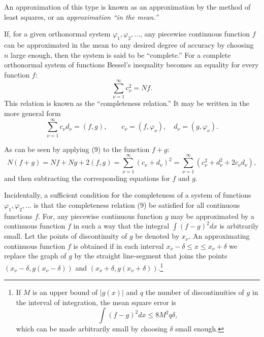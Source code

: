 An approximation of this type is known as an approximation by the method of least squares, or an \emph{approximation ``in the mean.''}

If, for a given orthonormal system $\varphi_1,\varphi_2,\ldots$, any piecewise continuous function $f$ can be approximated in the mean to any desired degree of accuracy by choosing $n$ large enough, then the system is said to be ``complete.'' For a complete orthonormal system of functions Bessel's inequality becomes an equality for every function $f$:
\begin{equation}\sum_{\nu=1}^{\infty}c_\nu^2=Nf.\tag{9}\end{equation}
This relation is known as the ``completeness relation.'' It may be written in the more general form
\begin{equation}\sum_{\nu=1}^{\infty}c_\nu d_\nu=(f,g),\qquad c_\nu=(f,\varphi_\nu),\quad d_\nu=(g,\varphi_\nu).\tag{9'}\end{equation}

As can be seen by applying (9) to the function $f+g$:
\[
N(f+g)=Nf+Ng+2(f,g)=\sum_{\nu=1}^{\infty}(c_\nu+d_\nu)^2
=\sum_{\nu=1}^{\infty}(c_\nu^2+d_\nu^2+2c_\nu d_\nu),
\]
and then subtracting the corresponding equations for $f$ and $g$.

Incidentally, a sufficient condition for the completeness of a system of functions $\varphi_1,\varphi_2,\ldots$ is that the completeness relation (9) be satisfied for all continuous functions $f$. For, any piecewise continuous function $g$ may be approximated by a continuous function $f$ in such a way that the integral $\int(f-g)^2dx$ is arbitrarily small. Let the points of discontinuity of $g$ be denoted by $x_\nu$. An approximating continuous function $f$ is obtained if in each interval $x_\nu-\delta\le x\le x_\nu+\delta$ we replace the graph of $g$ by the straight line-segment that joins the points $(x_\nu-\delta,g(x_\nu-\delta))$ and $(x_\nu+\delta,g(x_\nu+\delta))$.\footnote{If $M$ is an upper bound of $|g(x)|$ and $q$ the number of discontinuities of $g$ in the interval of integration, the mean square error is
\[
\int(f-g)^2dx\le 8M^2q\delta,
\]
which can be made arbitrarily small by choosing $\delta$ small enough.}

